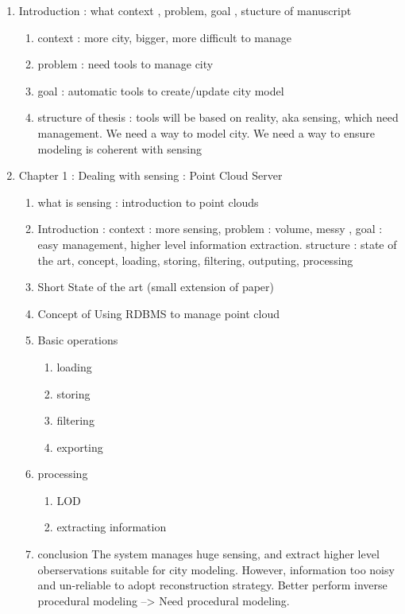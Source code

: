 \documentclass{article}
\begin{document}
 
 
 \begin{enumerate}
 \item Introduction : what context , problem, goal , stucture of manuscript
 	 \begin{enumerate}
 	 	\item context : more city, bigger, more difficult to manage
 	 	\item problem : need tools to manage city
 	 	\item goal : automatic tools to create/update city model
 	 	\item structure of thesis : 
 	 		tools will be based on reality, aka sensing, which need management.
 	 		We need a way to model city.
			We need a way to ensure modeling is coherent with sensing
 	 \end{enumerate}
 	 
 \item Chapter 1 : Dealing with sensing : Point Cloud Server
 	 \begin{enumerate} 
  	 	\item what is sensing : introduction to point clouds
  	 	\item Introduction : context : more sensing, problem : volume, messy , goal : easy management, higher level information extraction. structure : state of the art, concept, loading, storing, filtering, outputing, processing
  	 	\item Short State of the art (small extension of paper)
  	 	\item Concept of Using RDBMS to manage point cloud
  	 	\item Basic operations
  	 	\begin{enumerate} 
  	 		\item loading
		  	 \item storing
		  	 \item filtering
		  	 \item exporting	
  	 	\end{enumerate}
  	 	\item processing
  	 		\begin{enumerate} 
  	 	  	 	\item LOD
  	 			\item extracting information	
  	 	  	\end{enumerate}
  	 	\item conclusion
  	 		The system manages huge sensing, and extract higher level oberservations suitable for city modeling. However, information too noisy and un-reliable to adopt reconstruction strategy. Better perform inverse procedural modeling --> Need procedural modeling.
  	 \end{enumerate}
  	 

\end{enumerate}
\end{document}
